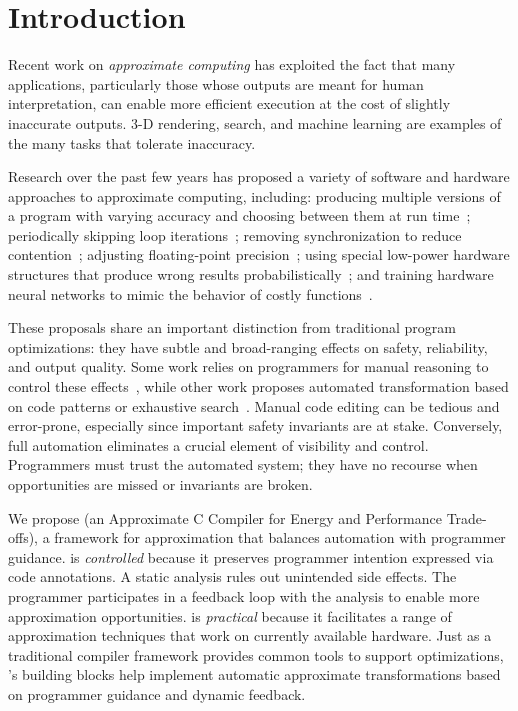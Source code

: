 \section{Introduction}\label{sec:intro}

%
Recent work on \emph{approximate computing} has exploited the fact that 
many applications, particularly those whose outputs are meant for human
interpretation, can enable more efficient execution at the cost of slightly
inaccurate outputs. 3-D rendering, search, and machine learning
are examples of the many tasks that tolerate inaccuracy.

Research over the past few years has proposed a variety of software and hardware 
approaches to approximate computing, including:
%
producing multiple versions of a program with varying accuracy and choosing
between them at run
time~\cite{green, dynamicknobs};
%
periodically skipping loop iterations~\cite{perforation, qosprof};
%
removing synchronization to reduce contention~\cite{dubstep, quickstep, races-ibm};
%
adjusting floating-point precision~\cite{precimonious};
%
using special low-power hardware
structures that produce wrong results probabilistically~\cite{truffle, flikker};
%
and training hardware neural networks to mimic the behavior of costly
functions~\cite{npu, anpu}.

These proposals share an important distinction
from traditional program optimizations:
they have subtle and broad-ranging effects on safety, reliability, and output
quality.
Some work relies on programmers for manual reasoning to control
these
effects~\cite{npu, flikker, races-ibm, perforation},
while other work proposes automated transformation based on code
patterns or exhaustive search~\cite{green, paraprox, sage}.
Manual code editing can be tedious and error-prone, especially since
important safety invariants are at stake.
Conversely, full automation eliminates a crucial element of
visibility and control.
Programmers must trust the automated system; they have no recourse when
opportunities are missed or invariants are broken.

We propose \sysname
(an Approximate C Compiler for Energy and Performance Trade-offs),
a framework for approximation that balances automation with programmer
guidance.
\sysname is \emph{controlled} because it preserves programmer intention
expressed via code annotations.
A static analysis rules out
unintended side effects. The programmer participates in a feedback loop with
the analysis to enable more approximation
opportunities.
\sysname is \emph{practical} because it facilitates a range
of approximation techniques that work on currently available hardware.
Just as a traditional compiler framework provides common tools to support
optimizations,
\sysname's building blocks help implement automatic
approximate transformations based on programmer guidance and dynamic feedback.

